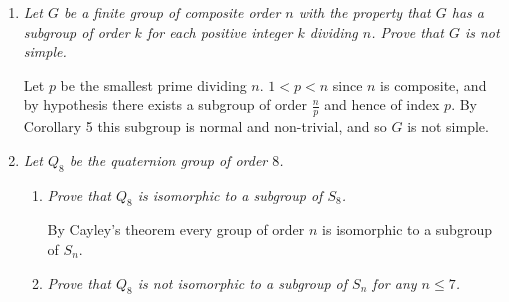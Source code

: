 \documentclass[letterpaper, 11pt]{article}
\begin{document}
\begin{enumerate}
\item \emph{Let $G$ be a finite group of composite order $n$ with the property that $G$ has a subgroup of order $k$ for each positive integer $k$ dividing $n$.  Prove that $G$ is not simple.}

Let $p$ be the smallest prime dividing $n$.  $1 < p < n$ since $n$ is composite, and by hypothesis there exists a subgroup of order $\frac{n}{p}$ and hence of index $p$.  By Corollary 5 this subgroup is normal and non-trivial, and so $G$ is not simple.

\item \emph{Let $Q_8$ be the quaternion group of order $8$.}
\begin{enumerate}
\item \emph{Prove that $Q_8$ is isomorphic to a subgroup of $S_8$.}

By Cayley's theorem every group of order $n$ is isomorphic to a subgroup of $S_n$.

\item \emph{Prove that $Q_8$ is not isomorphic to a subgroup of $S_n$ for any $n \leq 7$.}


\end{enumerate}

\end{enumerate}
\end{document}
